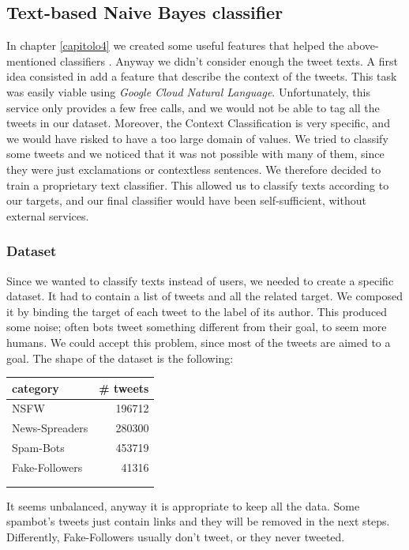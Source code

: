 \subsection{Text-based Naive Bayes classifier}
In chapter \ref{capitolo4} we created some useful features that helped the above-mentioned classifiers . Anyway we didn't consider enough the tweet texts. A first idea consisted in add a feature that describe the context of the tweets. This task was easily viable using \textit{Google Cloud Natural Language}. Unfortunately, this service only provides a few free calls, and we would not be able to tag all the tweets in our dataset. Moreover, the Context Classification is very specific, and we would have risked to have a too large domain of values. We tried to classify some tweets and we noticed that it was not possible with many of them, since they were just exclamations or contextless sentences. We therefore decided to train a proprietary text classifier. This allowed us to classify texts according to our targets, and our final classifier would have been self-sufficient, without external services.
\subsubsection{Dataset}
Since we wanted to classify texts instead of users, we needed to create a specific dataset.
It had to contain a list of tweets and all the related target. We composed it by binding the target of each tweet to the label of its author. This produced some noise; often bots tweet something different from their goal, to seem more humans. We could accept this problem, since most of the tweets are aimed to a goal.
The shape of the dataset is the following:

\begin{center}
	\begin{tabular}{lr}
		category&\# tweets\\
		\hline\hline
		NSFW&196712\\
		News-Spreaders&280300\\
		Spam-Bots&453719\\
		Fake-Followers&41316\\
		\hline\\\\
	\end{tabular}
\end{center}

It seems unbalanced, anyway it is appropriate to keep all the data. Some spambot's tweets just contain links and they will be removed in the next steps. Differently, Fake-Followers usually don't tweet, or they never tweeted.

